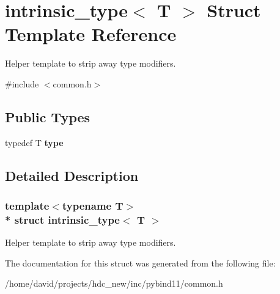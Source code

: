\hypertarget{structintrinsic__type}{}\section{intrinsic\+\_\+type$<$ T $>$ Struct Template Reference}
\label{structintrinsic__type}


Helper template to strip away type modifiers.  




{\ttfamily \#include $<$common.\+h$>$}

\subsection*{Public Types}
\begin{DoxyCompactItemize}
\item 
typedef T {\bfseries type}\hypertarget{structintrinsic__type_ab90beb94ea8a923b5435bf0011bc926f}{}\label{structintrinsic__type_ab90beb94ea8a923b5435bf0011bc926f}

\end{DoxyCompactItemize}


\subsection{Detailed Description}
\subsubsection*{template$<$typename T$>$\\*
struct intrinsic\+\_\+type$<$ T $>$}

Helper template to strip away type modifiers. 

The documentation for this struct was generated from the following file\+:\begin{DoxyCompactItemize}
\item 
/home/david/projects/hdc\+\_\+new/inc/pybind11/common.\+h\end{DoxyCompactItemize}
